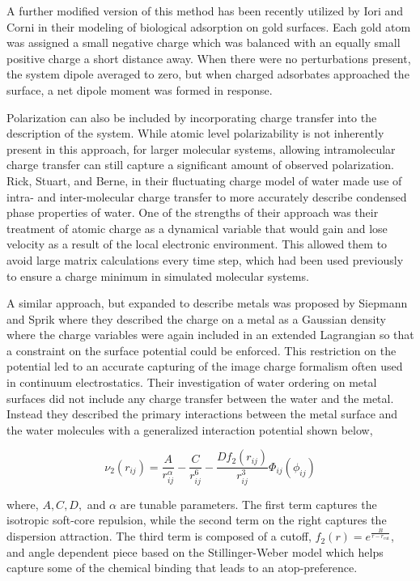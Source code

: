 A further modified version of this method has been recently utilized by Iori
and Corni in their modeling of biological adsorption on gold
surfaces.\citep{Iori:2008ic, Iori:2009au} Each gold atom was assigned a small
negative charge which was balanced with an equally small positive charge a
short distance away. When there were no perturbations present, the system
dipole averaged to zero, but when charged adsorbates approached the surface, a
net dipole moment was formed in response.

Polarization can also be included by incorporating charge transfer into the
description of the system. While atomic level polarizability is not inherently
present in this approach, for larger molecular systems, allowing
intramolecular charge transfer can still capture a significant amount of
observed polarization. Rick, Stuart, and Berne, in their fluctuating charge
model of water made use of intra- and inter-molecular charge transfer to more
accurately describe condensed phase properties of water.\citep{Rick:1994ss} One of the
strengths of their approach was their treatment of atomic charge as a dynamical
variable that would gain and lose velocity as a result of the local electronic
environment. This allowed them to avoid large matrix calculations every time
step, which had been used previously to ensure a charge minimum in simulated
molecular systems. 

A similar approach, but expanded to describe metals was proposed by Siepmann
and Sprik where they described the charge on a metal as a Gaussian density
where the charge variables were again included in an extended Lagrangian so
that a constraint on the surface potential could be
enforced.\citep{Siepmann:1995es} This restriction on the potential led to an
accurate capturing of the image charge formalism often used in continuum
electrostatics. Their investigation of water ordering on metal surfaces did not
include any charge transfer between the water and the metal. Instead they
described the primary interactions between the metal surface and the water
molecules with a generalized interaction potential shown below,

\begin{equation}
\nu_2(r_{ij}) = \frac{A}{r_{ij}^\alpha} - \frac{C}{r_{ij}^6} - \frac{Df_2(r_{ij})}{r_{ij}^3}\Phi_{ij}(\phi_{ij})
\end{equation}

where, $A, C, D, $ and $\alpha$ are tunable parameters. The first term captures
the isotropic soft-core repulsion, while the second term on the right captures
the dispersion attraction. The third term is composed of a cutoff, $f_2(r) =
e^{\frac{B}{r-r_{\mathrm{cut}}}}$, and angle dependent piece based on the
Stillinger-Weber model\citep{Stillinger:1985tb} which helps capture some of the
chemical binding that leads to an atop-preference.

